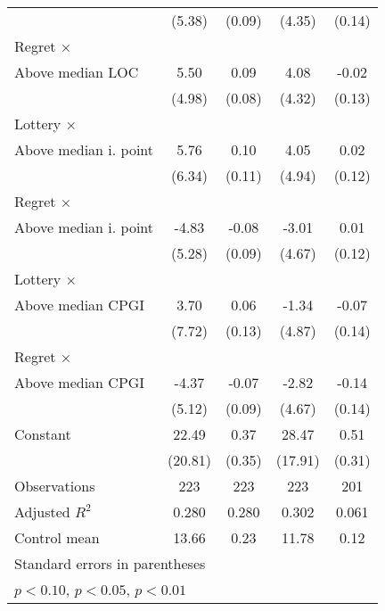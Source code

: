 \begin{table}[htbp]
\begin{tabular}{l*{4}{c}}
                &   (5.38)         &   (0.09)         &   (4.35)         &   (0.14)         \\
\addlinespace
Regret $\times$ \\ Above median LOC&     5.50         &     0.09         &     4.08         &    -0.02         \\
                &   (4.98)         &   (0.08)         &   (4.32)         &   (0.13)         \\
\addlinespace
Lottery $\times$ \\ Above median i. point&     5.76         &     0.10         &     4.05         &     0.02         \\
                &   (6.34)         &   (0.11)         &   (4.94)         &   (0.12)         \\
\addlinespace
Regret $\times$ \\ Above median i. point&    -4.83         &    -0.08         &    -3.01         &     0.01         \\
                &   (5.28)         &   (0.09)         &   (4.67)         &   (0.12)         \\
\addlinespace
Lottery $\times$ \\ Above median CPGI&     3.70         &     0.06         &    -1.34         &    -0.07         \\
                &   (7.72)         &   (0.13)         &   (4.87)         &   (0.14)         \\
\addlinespace
Regret $\times$ \\ Above median CPGI&    -4.37         &    -0.07         &    -2.82         &    -0.14         \\
                &   (5.12)         &   (0.09)         &   (4.67)         &   (0.14)         \\
\addlinespace
Constant        &    22.49         &     0.37         &    28.47         &     0.51         \\
                &  (20.81)         &   (0.35)         &  (17.91)         &   (0.31)         \\
\midrule
Observations    &      223         &      223         &      223         &      201         \\
Adjusted \(R^{2}\)&    0.280         &    0.280         &    0.302         &    0.061         \\
Control mean    &    13.66         &     0.23         &    11.78         &     0.12         \\
\bottomrule
\multicolumn{5}{l}{\footnotesize Standard errors in parentheses}\\
\multicolumn{5}{l}{\footnotesize \sym{*} \(p<0.10\), \sym{**} \(p<0.05\), \sym{***} \(p<0.01\)}\\
\end{tabular}
\end{table}

